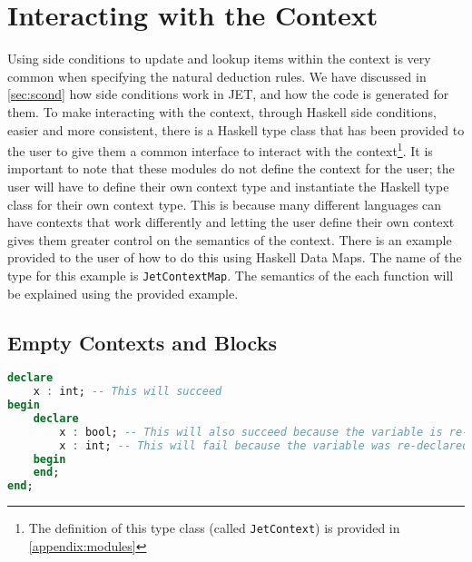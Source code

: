 \section{Interacting with the Context}
\label{sec:context}
Using side conditions to update and lookup items within the context is very common when specifying the natural deduction rules.
We have discussed in \autoref{sec:scond} how side conditions work in JET, and how the code is generated for them.
To make interacting with the context, through Haskell side conditions, easier and more consistent, there is a Haskell type class that has been provided to the user to give them a common interface to interact with the context\footnote{The definition of this type class (called \texttt{JetContext}) is provided in \autoref{appendix:modules}}.
It is important to note that these modules do not define the context for the user; the user will have to define their own context type and instantiate the Haskell type class for their own context type.
This is because many different languages can have contexts that work differently and letting the user define their own context gives them greater control on the semantics of the context.
There is an example provided to the user of how to do this using Haskell Data Maps\cite{haskelldatamap}.
The name of the type for this example is \texttt{JetContextMap}.
The semantics of the each function will be explained using the provided example.

\subsection{Empty Contexts and Blocks}
\label{sec:blocks}
\begin{lstlisting}[language=ada, caption=Example of declarations in a block structured language such as Ad, label=lst:blockDecl]
declare
    x : int; -- This will succeed
begin
    declare
        x : bool; -- This will also succeed because the variable is re-declared in a new block
        x : int; -- This will fail because the variable was re-declared in the same block as the previous declaration
    begin
    end;
end;
\end{lstlisting}

